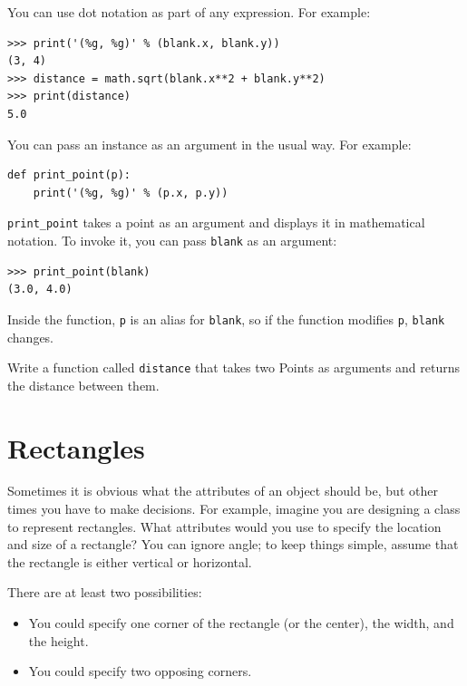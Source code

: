 \documentclass[10pt]{book}
\begin{document}
You can use dot notation as part of any expression.  For example:

\beforeverb
\begin{verbatim}
>>> print('(%g, %g)' % (blank.x, blank.y))
(3, 4)
>>> distance = math.sqrt(blank.x**2 + blank.y**2)
>>> print(distance)
5.0
\end{verbatim}
\afterverb
%
You can pass an instance as an argument in the usual way.
For example:


\beforeverb
\begin{verbatim}
def print_point(p):
    print('(%g, %g)' % (p.x, p.y))
\end{verbatim}
\afterverb
%
\verb"print_point" takes a point as an argument and displays it in
mathematical notation.  To invoke it, you can pass {\tt blank} as
an argument:

\beforeverb
\begin{verbatim}
>>> print_point(blank)
(3.0, 4.0)
\end{verbatim}
\afterverb
%
Inside the function, {\tt p} is an alias for {\tt blank}, so if
the function modifies {\tt p}, {\tt blank} changes.



\begin{ex}
Write a function called {\tt distance} that takes two Points
as arguments and returns the distance between them.
\end{ex}



\section{Rectangles}

Sometimes it is obvious what the attributes of an object should be,
but other times you have to make decisions.  For example, imagine you
are designing a class to represent rectangles.  What attributes would
you use to specify the location and size of a rectangle?  You can
ignore angle; to keep things simple, assume that the rectangle is
either vertical or horizontal.


There are at least two possibilities: 

\begin{itemize}

\item You could specify one corner of the rectangle
(or the center), the width, and the height.

\item You could specify two opposing corners.

\end{itemize}
\end{document}
